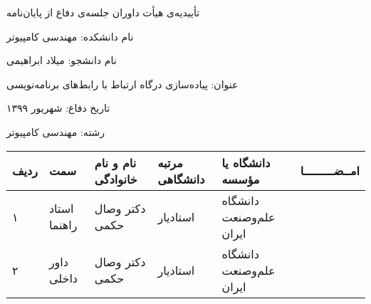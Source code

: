 \newpage
\thispagestyle{empty}

\begin{center}
{\Large
    تأییدیه‌ی هیأت داوران جلسه‌ی دفاع از پایان‌نامه
}
\end{center}
\vspace{1cm}

نام دانشكده: مهندسی کامپیوتر

نام دانشجو: میلاد ابراهیمی

عنوان: پیاده‌سازی درگاه ارتباط با رابط‌های برنامه‌نویسی

تاریخ دفاع: شهریور ۱۳۹۹

رشته: مهندسی کامپیوتر \\[50pt]
\begin{center}
    \begin{tabular}{| p{8mm} | p{18mm} | p{} |p{14mm}|p{}|c|}
        \hline
        ردیف & سمت & نام و نام خانوادگی & مرتبه دانشگاهی & دانشگاه یا مؤسسه & امــضـــــــــا\\
        \hline
        ۱ & استاد راهنما & دکتر \newline وصال حکمی & استادیار & دانشگاه علم‌و‌صنعت ایران &    \\
        \hline
        ۲ & داور داخلی & دکتر \newline وصال حکمی & استادیار & دانشگاه علم‌و‌صنعت ایران &     \\
        \hline


    \end{tabular}
\end{center}


\cleardoublepage 